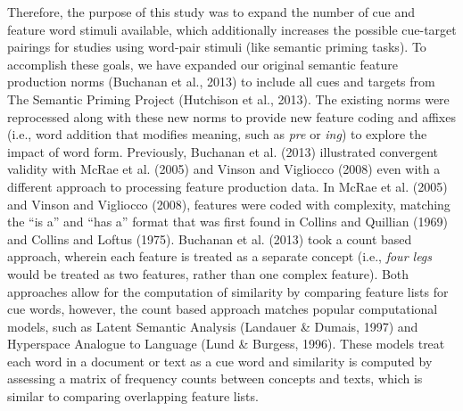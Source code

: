 \documentclass[english,,man]{apa6}
\begin{document}
Therefore, the purpose of this study was to expand the number of cue and feature word stimuli available, which additionally increases the possible cue-target pairings for studies using word-pair stimuli (like semantic priming tasks). To accomplish these goals, we have expanded our original semantic feature production norms (Buchanan et al., 2013) to include all cues and targets from The Semantic Priming Project (Hutchison et al., 2013). The existing norms were reprocessed along with these new norms to provide new feature coding and affixes (i.e., word addition that modifies meaning, such as \emph{pre} or \emph{ing}) to explore the impact of word form. Previously, Buchanan et al. (2013) illustrated convergent validity with McRae et al. (2005) and Vinson and Vigliocco (2008) even with a different approach to processing feature production data. In McRae et al. (2005) and Vinson and Vigliocco (2008), features were coded with complexity, matching the \enquote{is a} and \enquote{has a} format that was first found in Collins and Quillian (1969) and Collins and Loftus (1975). Buchanan et al. (2013) took a count based approach, wherein each feature is treated as a separate concept (i.e., \emph{four legs} would be treated as two features, rather than one complex feature). Both approaches allow for the computation of similarity by comparing feature lists for cue words, however, the count based approach matches popular computational models, such as Latent Semantic Analysis (Landauer \& Dumais, 1997) and Hyperspace Analogue to Language (Lund \& Burgess, 1996). These models treat each word in a document or text as a cue word and similarity is computed by assessing a matrix of frequency counts between concepts and texts, which is similar to comparing overlapping feature lists.
\end{document}
